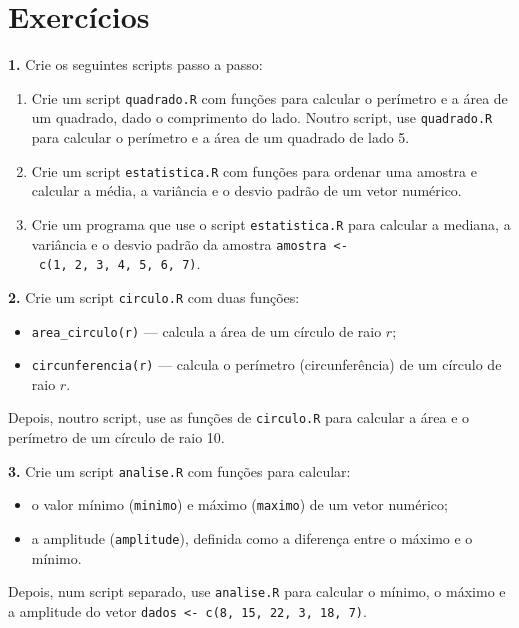 \documentclass[
  portuguese,
  11pt,
  openany]{book}
\providecommand{\tightlist}{%
  \setlength{\itemsep}{0pt}\setlength{\parskip}{0pt}}
\begin{document}
\section{Exercícios}\label{exercuxedcios-8}

\textbf{1.} Crie os seguintes scripts passo a passo:

\begin{enumerate}
\def\labelenumi{(\alph{enumi})}
\item
  Crie um script \texttt{quadrado.R} com funções para calcular o perímetro e a área de
  um quadrado, dado o comprimento do lado. Noutro script, use \texttt{quadrado.R} para
  calcular o perímetro e a área de um quadrado de lado 5.
\item
  Crie um script \texttt{estatistica.R} com funções para ordenar uma amostra e calcular a
  média, a variância e o desvio padrão de um vetor numérico.
\item
  Crie um programa que use o script \texttt{estatistica.R} para calcular a mediana, a
  variância e o desvio padrão da amostra \texttt{amostra\ \textless{}-\ c(1,\ 2,\ 3,\ 4,\ 5,\ 6,\ 7)}.
\end{enumerate}

\textbf{2.} Crie um script \texttt{circulo.R} com duas funções:

\begin{itemize}
\tightlist
\item
  \texttt{area\_circulo(r)} --- calcula a área de um círculo de raio \(r\);
\item
  \texttt{circunferencia(r)} --- calcula o perímetro (circunferência) de um círculo de raio
  \(r\).
\end{itemize}

Depois, noutro script, use as funções de \texttt{circulo.R} para calcular a área e o
perímetro de um círculo de raio 10.

\textbf{3.} Crie um script \texttt{analise.R} com funções para calcular:

\begin{itemize}
\tightlist
\item
  o valor mínimo (\texttt{minimo}) e máximo (\texttt{maximo}) de um vetor numérico;
\item
  a amplitude (\texttt{amplitude}), definida como a diferença entre o máximo e o mínimo.
\end{itemize}

Depois, num script separado, use \texttt{analise.R} para calcular o mínimo, o máximo e a
amplitude do vetor \texttt{dados\ \textless{}-\ c(8,\ 15,\ 22,\ 3,\ 18,\ 7)}.
\end{document}
